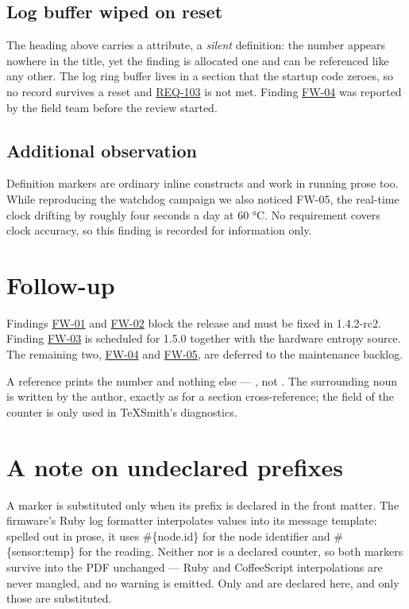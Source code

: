 \documentclass[a4paper,twoside]{article}
\begin{document}
\subsection{Log buffer wiped on reset}
\label{fw:log-wrap}
The heading above carries a  attribute, a \emph{silent} definition:
the number appears nowhere in the title, yet the finding is allocated one and
can be referenced like any other. The log ring buffer lives in a 
section that the startup code zeroes, so no record survives a reset and
\hyperref[req:log-retention]{REQ-103} is not met. Finding \hyperref[fw:log-wrap]{FW-04} was reported by the field
team before the review started.
\subsection{Additional observation}
Definition markers are ordinary inline constructs and work in running prose
too. While reproducing the watchdog campaign we also noticed \leavevmode{}\label{fw:rtc-drift}FW-05,
the real-time clock drifting by roughly four seconds a day at 60 °C. No
requirement covers clock accuracy, so this finding is recorded for information
only.
\section{Follow-up}
Findings \hyperref[fw:watchdog]{FW-01} and \hyperref[fw:ota-brick]{FW-02} block the release and must be fixed in
1.4.2-rc2. Finding \hyperref[fw:key-entropy]{FW-03} is scheduled for 1.5.0 together with the
hardware entropy source. The remaining two, \hyperref[fw:log-wrap]{FW-04} and \hyperref[fw:rtc-drift]{FW-05}, are
deferred to the maintenance backlog.

A reference prints the number and nothing else --- , not .
The surrounding noun is written by the author, exactly as for a section
cross-reference; the  field of the counter is only used in TeXSmith's
diagnostics.
\section{A note on undeclared prefixes}
A marker is substituted only when its prefix is declared in the front matter.
The firmware's Ruby log formatter interpolates values into its message
template: spelled out in prose, it uses \#\{node.id\} for the node identifier and
\#\{sensor:temp\} for the reading. Neither  nor  is a declared
counter, so both markers survive into the PDF unchanged --- Ruby and CoffeeScript
interpolations are never mangled, and no warning is emitted. Only  and
 are declared here, and only those are substituted.
\end{document}
